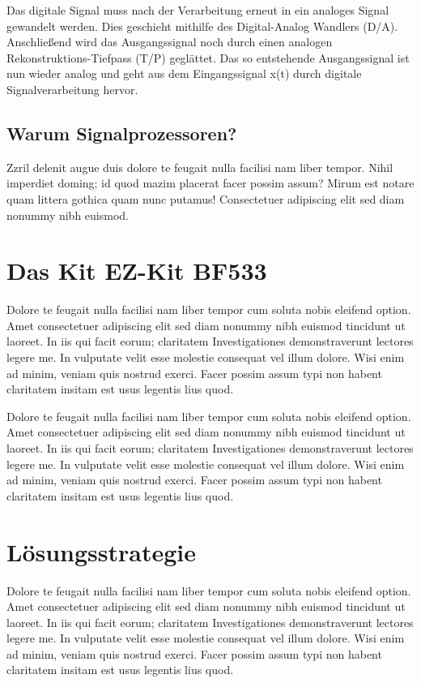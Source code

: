 \documentclass[a4paper,12pt,fontsize=12,DIV=12]{scrartcl}
\begin{document}
Das digitale Signal muss nach der Verarbeitung erneut in ein analoges Signal gewandelt werden. Dies geschieht mithilfe des Digital-Analog Wandlers (D/A). Anschließend wird das Ausgangssignal noch durch einen analogen Rekonstruktions-Tiefpass (T/P) geglättet. Das so entstehende Ausgangssignal ist nun wieder analog und geht aus dem Eingangssignal x(t) durch digitale Signalverarbeitung hervor.

\subsection{Warum Signalprozessoren?}
Zzril delenit augue duis dolore te feugait nulla facilisi nam liber tempor. Nihil imperdiet doming; id quod mazim placerat facer possim assum? Mirum est notare quam littera gothica 
quam nunc putamus! Consectetuer adipiscing elit sed diam nonummy nibh euismod.

\section{Das Kit EZ-Kit BF533}
Dolore te feugait nulla facilisi nam liber tempor cum soluta nobis eleifend option. Amet consectetuer adipiscing elit sed diam nonummy nibh euismod tincidunt ut laoreet. In iis qui facit eorum; claritatem Investigationes demonstraverunt lectores legere me. In vulputate velit esse molestie consequat vel illum dolore. Wisi enim ad minim, veniam quis nostrud exerci. Facer possim assum typi non habent claritatem insitam est usus legentis lius quod.

Dolore te feugait nulla facilisi nam liber tempor cum soluta nobis eleifend option. Amet consectetuer adipiscing elit sed diam nonummy nibh euismod tincidunt ut laoreet. In iis qui facit eorum; claritatem Investigationes demonstraverunt lectores legere me. In vulputate velit esse molestie consequat vel illum dolore. Wisi enim ad minim, veniam quis nostrud exerci. Facer possim assum typi non habent claritatem insitam est usus legentis lius quod.

\section{Lösungsstrategie}
Dolore te feugait nulla facilisi nam liber tempor cum soluta nobis eleifend option. Amet consectetuer adipiscing elit sed diam nonummy nibh euismod tincidunt ut laoreet. In iis qui facit eorum; claritatem Investigationes demonstraverunt lectores legere me. In vulputate velit esse molestie consequat vel illum dolore. Wisi enim ad minim, veniam quis nostrud exerci. Facer possim assum typi non habent claritatem insitam est usus legentis lius quod.
\end{document}

